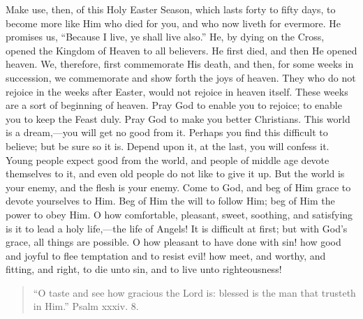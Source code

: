 Make use, then, of this Holy Easter Season, which lasts forty to
fifty days, to become more like Him who died for you, and who now
liveth for evermore. He promises us, ``Because I live, ye shall
live also.'' He, by dying on the Cross, opened the Kingdom of
Heaven to all believers. He first died, and then He opened heaven. We,
therefore, first commemorate His death, and then, for some weeks in
succession, we commemorate and show forth the joys of heaven. They who
do not rejoice in the weeks after Easter, would not rejoice in heaven
itself. These weeks are a sort of beginning of heaven. Pray God to
enable you to rejoice; to enable you to keep the Feast duly. Pray God
to make you better Christians. This world is a dream,—you will get
no good from it. Perhaps you find this difficult to believe; but be
sure so it is. Depend upon it, at the last, you will confess it. Young
people expect good from the world, and people of middle age devote
themselves to it, and even old people do not like to give it up. But
the world is your enemy, and the flesh is your enemy. Come to God, and
beg of Him grace to devote yourselves to Him. Beg of Him the will to
follow Him; beg of Him the power to obey Him. O how comfortable,
pleasant, sweet, soothing, and satisfying is it to lead a holy life,—the
life of Angels! It is difficult at first; but with God's grace, all
things are possible. O how pleasant to have done with sin! how good
and joyful to flee temptation and to resist evil! how meet, and
worthy, and fitting, and right, to die unto sin, and to live unto
righteousness!


\begin{quote}

``O taste and see how gracious the Lord is:
blessed is the man that trusteth in Him.''
Psalm xxxiv. 8.

\end{quote}

